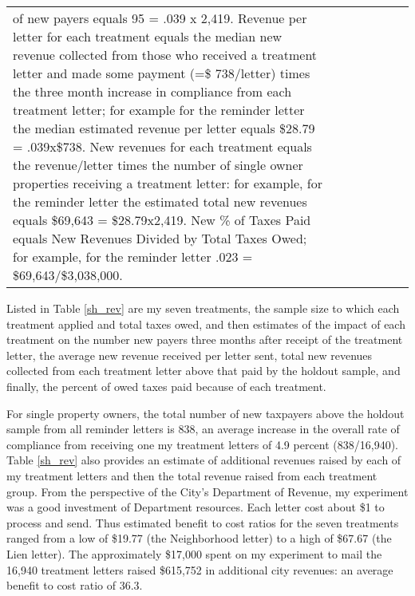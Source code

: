 \begin{table}[htb]
\begin{adjustbox}{width=\textwidth,totalheight=0.9\textheight,keepaspectratio}
\begin{tabular}{lcccccc}
{  of new payers equals 95 = .039 x 2,419.  Revenue per letter for each
  treatment equals the median new revenue collected from those who
  received a treatment letter and made some payment (=\$ 738/letter)
  times the three month increase in compliance from each treatment
  letter; for example for the reminder letter the median estimated
  revenue per letter equals \$28.79 = .039x\$738.  New revenues for
  each treatment equals the revenue/letter times the number of single
  owner properties receiving a treatment letter: for example, for the
  reminder letter the estimated total new revenues equals \$69,643 =
  \$28.79x2,419.  New \% of Taxes Paid equals New Revenues Divided by
  Total Taxes Owed; for example, for the reminder letter .023 =
  \$69,643/\$3,038,000.}
\end{tabular}
\end{adjustbox}
\end{table}

Listed in Table \ref{sh_rev} are my seven treatments, the sample size
to which each treatment applied and total taxes owed, and then
estimates of the impact of each treatment on the number new payers
three months after receipt of the treatment letter, the average new
revenue received per letter sent, total new revenues collected from
each treatment letter above that paid by the holdout sample, and
finally, the percent of owed taxes paid because of each treatment.

For single property owners, the total number of new taxpayers above
the holdout sample from all reminder letters is 838, an average
increase in the overall rate of compliance from receiving one my
treatment letters of 4.9 percent (838/16,940).  Table \ref{sh_rev}
also provides an estimate of additional revenues raised by each of my
treatment letters and then the total revenue raised from each
treatment group.  From the perspective of the City's Department of
Revenue, my experiment was a good investment of Department resources.
Each letter cost about \$1 to process and send.  Thus estimated
benefit to cost ratios for the seven treatments ranged from a low of
\$19.77 (the Neighborhood letter) to a high of \$67.67 (the Lien
letter).  The approximately \$17,000 spent on my experiment to mail
the 16,940 treatment letters raised \$615,752 in additional city
revenues: an average benefit to cost ratio of 36.3.

